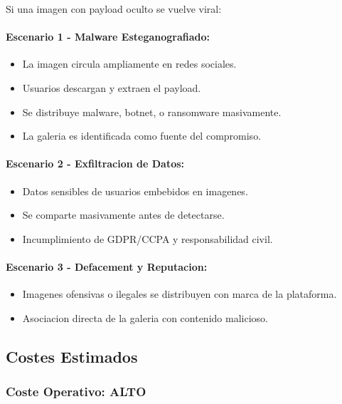 \documentclass[12pt,a4paper]{article}
\begin{document}
Si una imagen con payload oculto se vuelve viral:

\paragraph{Escenario 1 - Malware Esteganografiado:}

\begin{itemize}
    \item La imagen circula ampliamente en redes sociales.
    \item Usuarios descargan y extraen el payload.
    \item Se distribuye malware, botnet, o ransomware masivamente.
    \item La galeria es identificada como fuente del compromiso.
\end{itemize}

\paragraph{Escenario 2 - Exfiltracion de Datos:}

\begin{itemize}
    \item Datos sensibles de usuarios embebidos en imagenes.
    \item Se comparte masivamente antes de detectarse.
    \item Incumplimiento de GDPR/CCPA y responsabilidad civil.
\end{itemize}

\paragraph{Escenario 3 - Defacement y Reputacion:}

\begin{itemize}
    \item Imagenes ofensivas o ilegales se distribuyen con marca de la plataforma.
    \item Asociacion directa de la galeria con contenido malicioso.
\end{itemize}

\subsection{Costes Estimados}

\subsubsection{Coste Operativo: ALTO}
\end{document}
